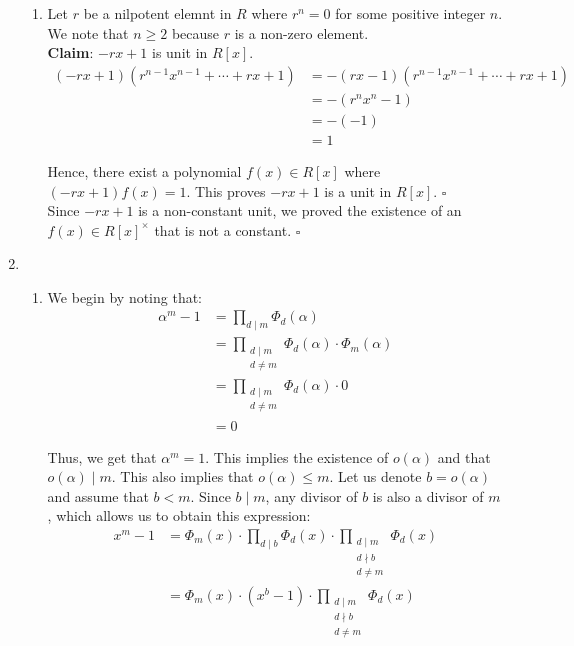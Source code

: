 \documentclass{article}
\begin{document}
\begin{enumerate}
\begin{enumerate}
    \item 
    Let $r$ be a nilpotent elemnt in $R$ where $r^n = 0$ for some positive integer $n$. We note that $n \geq 2$ because $r$ is a non-zero element. \\

    \textbf{Claim}: $-rx + 1$ is unit in $R[x]$. \\

    \begin{align*}
        (-rx + 1)(r^{n-1}x^{n-1} + \cdots + rx + 1) &= -(rx - 1)(r^{n-1}x^{n-1} + \cdots + rx + 1) \\
        &= -(r^nx^n - 1)\\
        &= -(-1)\\
        &= 1
    \end{align*}

    Hence, there exist a polynomial $f(x) \in R[x]$ where $(-rx + 1)f(x) = 1$. This proves $-rx + 1$ is a unit in $R[x]$. \hfill $\square$ \\

    Since $-rx + 1$ is a non-constant unit, we proved the existence of an $f(x) \in R[x]^{\times}$ that is not a constant. \hfill $\square$
\end{enumerate}

\newpage
\item
\begin{enumerate}
    \item 
    We begin by noting that: 
    \begin{align*}
        \alpha^m - 1 &= \prod_{d \mid m} \Phi_d(\alpha) \\
        &= \prod_{\substack{d \mid m \\ d \neq m}} \Phi_d(\alpha) \cdot \Phi_m(\alpha) \\ 
        &= \prod_{\substack{d \mid m \\ d \neq m}} \Phi_d(\alpha) \cdot 0 \\
        &= 0
    \end{align*}

    Thus, we get that $\alpha^m = 1$. This implies the existence of $o(\alpha)$ and that $o(\alpha) \mid m$. This also implies that $o(\alpha) \leq m$. Let us denote $b = o(\alpha)$ and assume that $b < m$. Since $b \mid m$, any divisor of $b$ is also a divisor of $m$, which allows us to obtain this expression: 
    \begin{align*}
        x^m - 1 &= \Phi_m(x) \cdot \prod_{d \mid b} \Phi_d(x) \cdot \prod_{\substack{d \mid m \\ d \nmid b \\ d \neq m}} \Phi_d(x)\\
        &= \Phi_m(x) \cdot(x^b - 1) \cdot \prod_{\substack{d \mid m \\ d \nmid b \\ d \neq m}} \Phi_d(x)
    \end{align*}


\end{enumerate}
\end{enumerate}
\end{document}
